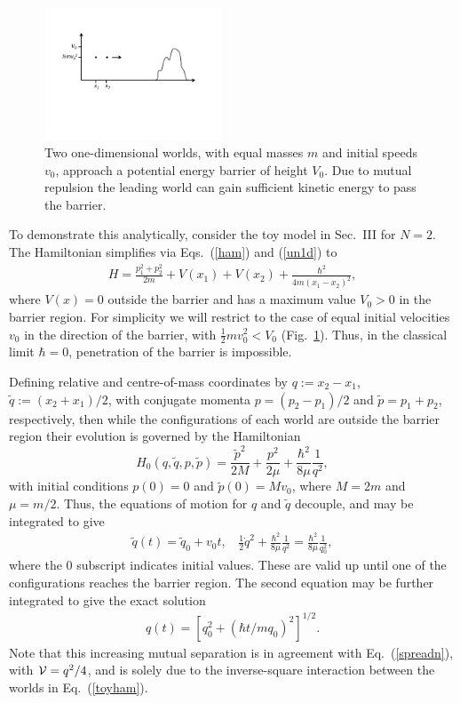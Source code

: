 \documentclass[12pt, aps,pra,amsmath,amssymb,superscriptaddress]{revtex4-2}
\renewcommand{\(}{\left(}
\renewcommand{\)}{\right)}
\newcommand{\blk}{\color{black}}
\begin{document}
\begin{figure}[!t]
	\centering
		\includegraphics[width=0.47\textwidth]{barrier.pdf}
	
\caption{Two one-dimensional worlds, with equal masses $m$ and initial speeds $v_0$, approach a potential energy barrier of height $V_0$. Due to mutual repulsion the leading world can gain sufficient kinetic energy to pass the barrier. \label{fig:barrier}}
\end{figure}


To demonstrate this analytically, consider the  toy model  in Sec.~III for $N=2$.  The  Hamiltonian simplifies via Eqs.~(\ref{ham}) and (\ref{un1d}) to
\begin{align} \label{toyham}
H = \frac{p_1^2+p_2^2}{2m} + V(x_1) + V(x_2) +\frac{\hbar^2}{4m(x_1-x_2)^2},
\end{align}
where $V(x)=0$ outside the barrier and has a maximum value $V_0>0$ in the barrier region. For simplicity we will restrict to the case of equal initial velocities $v_0$ in the direction of the barrier, with $\frac{1}{2}mv_0^2<V_0$ (Fig.~\ref{fig:barrier}).  Thus, in the classical limit $\hbar  = 0$, penetration of the barrier is impossible.

Defining relative and centre-of-mass coordinates by $q:=x_2-x_1$, $\tilde{q}:=(x_2+x_1)/2$, with conjugate momenta $p=(p_2-p_1)/2$ and $\tilde{p}=p_1+p_2$, respectively, then while the configurations of each world are outside the barrier region their evolution is governed by the Hamiltonian
\[ H_0(q,\tilde{q},p,\tilde{p}) = \frac{\tilde{p}^2}{2M} + \frac{p^2}{2\mu} + \frac{\hbar^2}{8\mu} \frac{1}{q^2}, \]
with initial conditions  $p(0)=0$ and $\tilde{p}(0) = Mv_0$, where $M=2m$ and $\mu=m/2$.  Thus, the equations of motion for $q$ and $\tilde{q}$ decouple, and may be integrated to give
\begin{align} \label{cons}
\tilde{q}(t)=\tilde{q}_0 + v_0 t,~~~~\frac{1}{2}\dot{q}^2 +  \frac{\hbar^2}{8\mu} \frac{1}{q^2} = \frac{\hbar^2}{8\mu} \frac{1}{q_0^2} ,
\end{align}
where the $0$ subscript indicates initial values. \blk These are valid up until one of the configurations reaches the barrier region. The second equation may be further integrated to give the exact solution
\begin{align}
q(t) = \left[q_0^2 + (\hbar t/mq_0)^2\right]^{1/2}.
\end{align}
Note that this increasing mutual separation is in agreement with Eq.~(\ref{spreadn}), with ${\cal V}=q^2/4$, 
and is solely due to the inverse-square interaction between the worlds in Eq.~(\ref{toyham}). 
\end{document}
